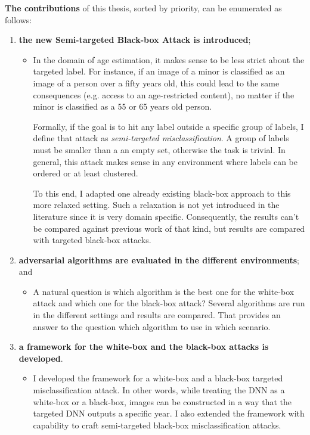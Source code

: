 \textbf{The contributions} of this thesis, sorted by priority, can be enumerated as follows:
\begin{enumerate}

\item \textbf{the new Semi-targeted Black-box Attack is introduced};
	\begin{itemize}
	\item In the domain of age estimation, it makes sense to be less strict about the targeted label. For instance, if an image of a minor is classified as an image of a person over a fifty years old, this could lead to the same consequences (e.g. access to an age-restricted content), no matter if the minor is classified as a 55 or 65 years old person. 
	
	Formally, if the goal is to hit any label outside a specific group of labels, I define that attack as \textit{semi-targeted misclassification}. A group of labels must be smaller than a an empty set, otherwise the task is trivial. In general, this attack makes sense in any environment where labels can be ordered or at least clustered.

To this end, I adapted one already existing black-box approach to this more relaxed setting. Such a relaxation is not yet introduced in the literature since it is very domain specific. Consequently, the results can't be compared against previous work of that kind, but results are compared with targeted black-box attacks.
	\end{itemize}
	
\item \textbf{adversarial algorithms are evaluated in the different environments}; and
	\begin{itemize}
		\item A natural question is which algorithm is the best one for the white-box attack and which one for the black-box attack? Several algorithms are run in the different settings and results are compared. That provides an answer to the question which algorithm to use in which scenario.
	\end{itemize}

\item \textbf{a framework for the white-box and the black-box attacks is developed}.
	\begin{itemize}
	\item I developed the framework for a white-box and a black-box targeted misclassification attack. In other words, while treating the DNN as a white-box or a black-box, images can be constructed in a way that the targeted DNN outputs a specific year. I also extended the framework with capability to craft semi-targeted black-box misclassification attacks.
	\end{itemize}
\end{enumerate}

